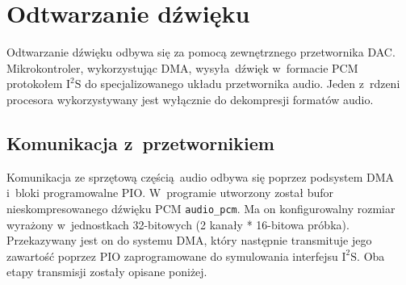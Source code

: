 \documentclass[polish]{aghengthesis}
\newcommand{\isqs}{$\text{I}^{2}\text{S}$}
\begin{document}
	\section{Odtwarzanie dźwięku}
%		
%		
%		
		
		
			
		Odtwarzanie dźwięku odbywa się za pomocą zewnętrznego przetwornika DAC. Mikrokontroler, wykorzystując DMA, wysyła dźwięk w~formacie PCM protokołem \isqs{} do specjalizowanego układu przetwornika audio. Jeden z~rdzeni procesora wykorzystywany jest wyłącznie do dekompresji formatów audio.
		
		
		\subsection{Komunikacja z~przetwornikiem}
			Komunikacja ze sprzętową częścią audio odbywa się poprzez podsystem DMA i~bloki programowalne PIO.
			W~programie utworzony został bufor nieskompresowanego dźwięku PCM \lstinline|audio_pcm|. Ma on konfigurowalny rozmiar wyrażony w~jednostkach 32-bitowych (2 kanały * 16-bitowa próbka). Przekazywany jest on do systemu DMA, który następnie transmituje jego zawartość poprzez PIO zaprogramowane do symulowania interfejsu \isqs{}. Oba etapy transmisji zostały opisane poniżej.
		
\end{document}
